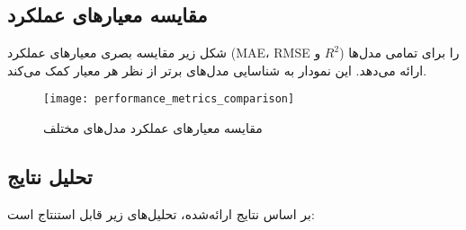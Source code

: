 \subsection{مقایسه معیارهای عملکرد}
شکل زیر مقایسه بصری معیارهای عملکرد (MAE، RMSE و \( R^2 \)) را برای تمامی مدل‌ها ارائه می‌دهد. این نمودار به شناسایی مدل‌های برتر از نظر هر معیار کمک می‌کند.

\begin{figure}[H]
	\centering
	\texttt{[image: performance\_metrics\_comparison]}
	\caption{مقایسه معیارهای عملکرد مدل‌های مختلف}
	\label{fig:performance_metrics_comparison}
\end{figure}

\subsection{تحلیل نتایج}
بر اساس نتایج ارائه‌شده، تحلیل‌های زیر قابل استنتاج است:

